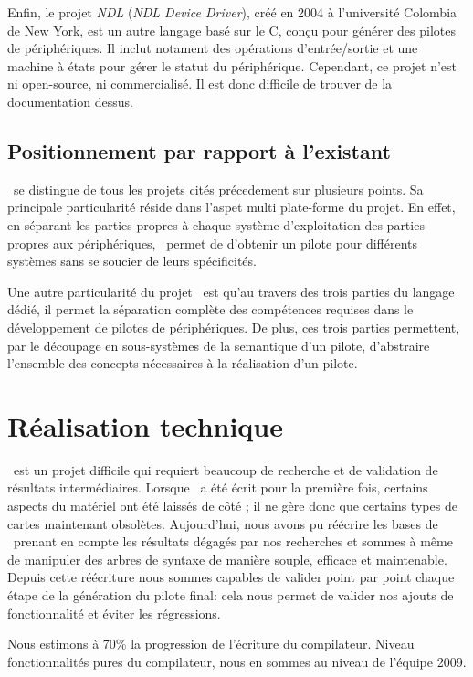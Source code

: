 \documentclass[francais]{rtxreport}
\begin{document}
Enfin, le projet \emph{NDL} (\emph{NDL Device Driver}), créé en 2004 à
l'université Colombia de New York, est un autre langage basé sur le C, conçu
pour générer des pilotes de périphériques. Il inclut notament des opérations
d'entrée/sortie et une machine à états pour gérer le statut du
périphérique. Cependant, ce projet n'est ni open-source, ni commercialisé. Il
est donc difficile de trouver de la documentation dessus.

\section{Positionnement par rapport à l'existant}
\rtx\ se distingue de tous les projets cités précedement sur plusieurs
points. Sa principale particularité réside dans l'aspet multi plate-forme du
projet. En effet, en séparant les parties propres à chaque système
d'exploitation des parties propres aux périphériques, \rtx\ permet de d'obtenir
un pilote pour différents systèmes sans se soucier de leurs spécificités.

Une autre particularité du projet \rtx\ est qu'au travers des trois parties du
langage dédié, il permet la séparation complète des compétences requises dans le
développement de pilotes de périphériques. De plus, ces trois parties
permettent, par le découpage en sous-systèmes de la semantique d'un pilote,
d'abstraire l'ensemble des concepts nécessaires à la réalisation d'un pilote.

\chapter{Réalisation technique}

\rtx\ est un projet difficile qui requiert beaucoup de recherche et de
validation de résultats intermédiaires. Lorsque \rtx\ a été écrit pour la
première fois, certains aspects du matériel ont été laissés de côté ; il ne gère
donc que certains types de cartes maintenant obsolètes. Aujourd'hui, nous avons
pu réécrire les bases de \rtx\ prenant en compte les résultats dégagés par nos
recherches et sommes à même de manipuler des arbres de syntaxe de manière
souple, efficace et maintenable. Depuis cette réécriture nous sommes capables de
valider point par point chaque étape de la génération du pilote final: cela nous
permet de valider nos ajouts de fonctionnalité et éviter les régressions.

Nous estimons à 70\% la progression de l’écriture du compilateur. Niveau
fonctionnalités pures du compilateur, nous en sommes au niveau de l'équipe 2009.
\end{document}
